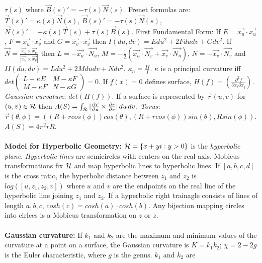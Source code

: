 $\tau(s)$ where  ${\vec B(s)}' = -\tau(s)  {\vec N (s)}$.  Frenet formulas are:
${\vec T (s)}' = \kappa(s) {\vec N(s)}$, 
${\vec B (s)}' = -\tau(s){\vec N(s)}$, 
${\vec N (s)}' = -\kappa(s) {\vec T(s)} + \tau(s) {\vec B(s)}$.
First Fundamental Form: 
If $E= {\vec {x_u}} \cdot {\vec {x_u}}$,
$F= {\vec {x_u}} \cdot {\vec {x_v}}$ and
$G= {\vec {x_v}} \cdot {\vec {x_v}}$ then $I(du, dv)= E du^2 + 2F du dv + G dv^2$.
If ${\vec N}= {\frac { {\vec {x_u}} \times {\vec {x_v}} }
{| {\vec {x_u}} \times {\vec {x_v}} |} }$ then
$L= -{\vec {x_u}} \cdot {\vec {N_u}}$,
$M= -{\frac 1 2}(
{\vec {x_u}} \cdot {\vec {N_v}} + {\vec {x_v}} \cdot {\vec {N_u}})$,
$N= -{\vec {x_v}} \cdot {\vec {N_v}}$ and $II(du,dv)= L du^2 + 2M du dv +N dv^2$.
$\kappa_n= {\frac {II} {I}}$.  $\kappa$ is a principal curvature iff
$det \left(
\begin{array}{cc}
L- \kappa E &  M - \kappa F \\
M - \kappa F &  N - \kappa G
\end{array}
\right) =0$.  
If $f(x)=0$ defines surface, $H(f)= ({\frac {\partial^2 f} {\partial x_i \partial x_j}})$.
\emph{Gaussian curvature}: $det(H(f))$.
If a surface is represented by ${\vec r}(u,v)$ for $(u,v) \in {\cal R}$ then
$A(S)= \int_{{\cal R}} 
|{\frac {\partial {\vec r}} {\partial u}} \times
{\frac {\partial {\vec r}} {\partial v}}| \thinspace du \thinspace dv
$.  \emph{Torus:} ${\vec r}( \theta, \phi)= (
(R+r cos(\phi)) cos(\theta),
(R+r cos(\phi)) sin(\theta), R sin(\phi)) $.  $A(S)= 4 \pi^2 rR$.
\\
\\
{\bf Model for Hyperbolic Geometry:}
${\cal H}= \{ x+yi: y>0 \}$ is the \emph{hyperbolic plane}.  \emph{Hyperbolic lines} are
semicircles with centers on the real axis.  Mobieus transformations fix ${\cal H}$ and
map hyperbolic lines to hyperbolic lines. If $[a,b,c,d]$ is the cross ratio, the hyperbolic distance between
$z_1$ and $z_2$ is $log([u,z_1, z_2, v])$ where $u$ and $v$ are the endpoints on the real line of
the hyperbolic line joining $z_1$ and $z_2$.  If a hyperbolic right trainagle consists of lines
of length $a, b, c$, $cosh(c)= cosh(a) \cdot cosh(b)$.  Any bijection mapping circles into cirlces is
a Mobieus transformation on $z$ or ${\overline z}$.
\\
\\
{\bf Gaussian curvature:} If $k_1$ and $k_2$ are the maximum and minimum values
of the curvature at a point on a surface, the Gaussian curvature is $K= k_1 k_2$;
$\chi=2-2g$ is the Euler characteristic, where $g$ is the genus.  $k_1$ and $k_2$ are
